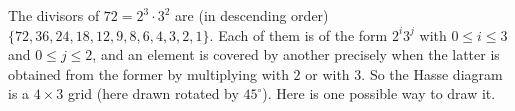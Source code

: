 \begin{gradedsolution}
  The divisors of $72 = 2^3 \cdot 3^2$ are (in descending order) $\{72, 36, 24, 18, 12, 9, 8, 6, 4, 3, 2, 1\}$.
  Each of them is of the form $2^i 3^j$ with $0 \leq i \leq 3$ and $0 \leq j \leq 2$, and an element is covered by another precisely when the latter is obtained from the former by multiplying with $2$ or with $3$.
  So the Hasse diagram is a $4 \times 3$ grid (here drawn rotated by $45^\circ$).
  Here is one possible way to draw it.
\begin{center}
\end{center}
\end{gradedsolution}
